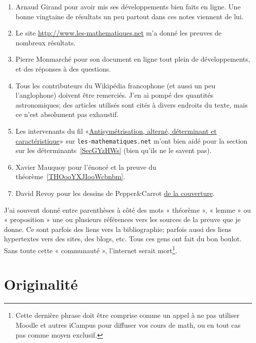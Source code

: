 \begin{enumerate}
	\item
	      Arnaud Girand pour avoir mis ses développements bien faits en ligne. Une bonne vingtaine de résultats un peu partout dans ces notes viennent de lui.
	\item
	      Le site \url{http://www.les-mathematiques.net} m'a donné les preuves de nombreux résultats.
	\item
	      Pierre Monmarché pour son document en ligne tout plein de développements, et des réponses à des questions.
	\item
	      Tous les contributeurs du Wikipédia francophone (et aussi un peu l'anglophone) doivent être remerciés. J'en ai pompé des quantités astronomiques; des articles utilisés sont cités à divers endroits du texte, mais ce n'est absolument pas exhaustif.
	\item
	      Les intervenants du fil «\href{http://www.les-mathematiques.net/phorum/read.php?2,302266}{Antisymétrisation, alterné, déterminant et caractéristique}» sur \texttt{les-mathematiques.net} m'ont bien aidé pour la section sur les déterminants~\ref{SecGYzHWs} (bien qu'ils ne le savent pas).
	\item
	      Xavier Mauquoy pour l'énoncé et la preuve du théorème~\ref{THOooYXJIooWcbnbm}.
	\item
	      David Revoy pour les dessins de Pepper\&Carrot \href{https://www.peppercarrot.com/fr/article285/episode-8-pepper-s-birthday-party}{de la couverture}.
\end{enumerate}

J'ai souvent donné entre parenthèses à côté des mots « théorème », « lemme » ou « proposition » une ou plusieurs références vers les sources de la preuve que je donne. Ce sont parfois des liens vers la bibliographie; parfois aussi des liens hypertextes vers des sites, des blogs, etc. Tous ces gens ont fait du bon boulot. Sans toute cette « communauté », l'internet serait mort\footnote{Cette dernière phrase doit être comprise comme un appel à ne pas utiliser Moodle et autres iCampus pour diffuser vos cours de math, ou en tout cas pas comme moyen exclusif.}.

\section{Originalité}
\label{SECooINTROoriginalite}


